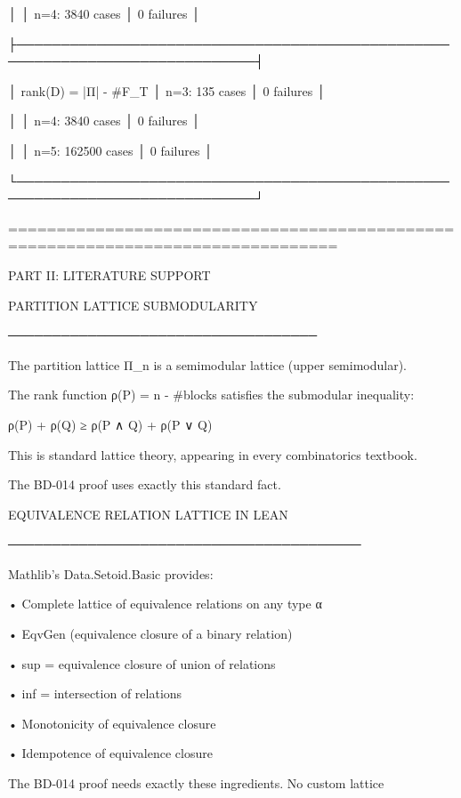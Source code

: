 │                         │ n=4: 3840 cases    │ 0 failures                   │

├─────────────────────────────────────────────────────────────────────────────┤

│ rank(D) = |Π| - #F_T    │ n=3: 135 cases     │ 0 failures                   │

│                         │ n=4: 3840 cases    │ 0 failures                   │

│                         │ n=5: 162500 cases  │ 0 failures                   │

└─────────────────────────────────────────────────────────────────────────────┘


================================================================================

PART II: LITERATURE SUPPORT




PARTITION LATTICE SUBMODULARITY

───────────────────────────────────

The partition lattice Π_n is a semimodular lattice (upper semimodular).

The rank function ρ(P) = n - #blocks satisfies the submodular inequality:




ρ(P) + ρ(Q) ≥ ρ(P ∧ Q) + ρ(P ∨ Q)


This is standard lattice theory, appearing in every combinatorics textbook.

The BD-014 proof uses exactly this standard fact.




EQUIVALENCE RELATION LATTICE IN LEAN

────────────────────────────────────────

Mathlib's Data.Setoid.Basic provides:

• Complete lattice of equivalence relations on any type α

• EqvGen (equivalence closure of a binary relation)

• sup = equivalence closure of union of relations

• inf = intersection of relations

• Monotonicity of equivalence closure

• Idempotence of equivalence closure




The BD-014 proof needs exactly these ingredients. No custom lattice

